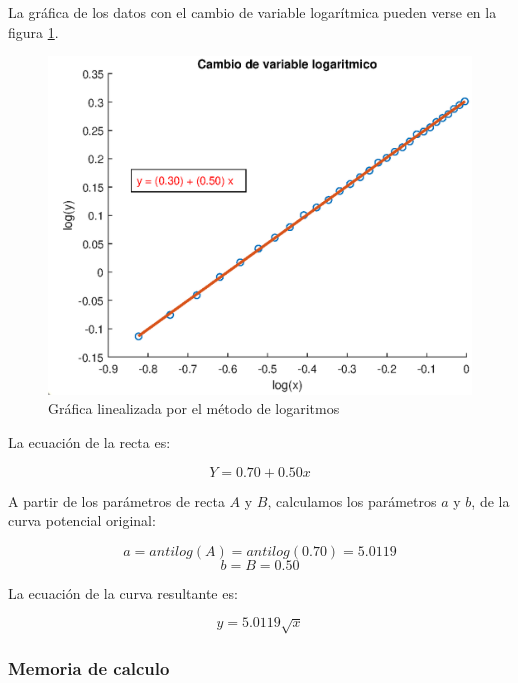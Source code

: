 \documentclass[letter,11pt]{article}
\begin{document}
La gráfica de los datos con el cambio de variable logarítmica pueden verse en la
figura \ref{practica34_2}.

\begin{figure}[!h]
\centering
\includegraphics[scale=1.00]{resources/3.4.2.eps}
\caption{Gráfica linealizada por el método de logaritmos}
\label{practica34_2}
\end{figure}

La ecuación de la recta es:

\begin{equation}
    Y = 0.70 + 0.50 x
\end{equation}

A partir de los parámetros de recta $A$ y $B$, calculamos los parámetros $a$ y
$b$, de la curva potencial original:

\begin{equation*}
    a = antilog(A) = antilog(0.70) = 5.0119
\end{equation*}
\begin{equation*}
    b = B = 0.50
\end{equation*}

La ecuación de la curva resultante es:

\begin{equation}
    y = 5.0119 \sqrt{x}
\end{equation}

\subsubsection{Memoria de calculo}
\end{document}
